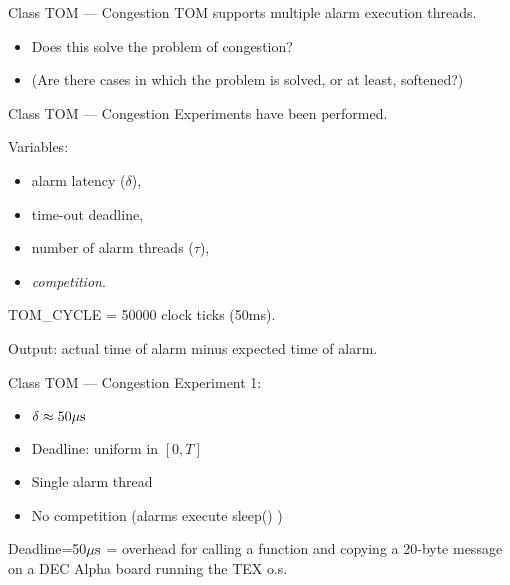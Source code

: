 \begin{frame}[fragile]{Class TOM --- Congestion}
\noindent
TOM supports multiple alarm execution threads.

\vspace{20pt}

\begin{itemize}
  \item Does this solve the problem of congestion?  
  \item (Are there cases in which the problem is solved, or 
  at least, softened?)
\end{itemize}



\end{frame}
\begin{frame}[fragile]{Class TOM --- Congestion}
\noindent
Experiments have been performed.

\noindent
Variables: 
\begin{itemize}
\item alarm latency ($\delta$),
\item time-out deadline,
\item number of alarm threads ($\tau$),
\item \emph{competition}.
\end{itemize}


\vspace{20pt}

\noindent
{\sf TOM\_CYCLE} = 50000 clock ticks (50ms).


\vspace{20pt}

\noindent
Output: actual time of alarm minus expected time of alarm.


\end{frame}
\begin{frame}[fragile]{Class TOM --- Congestion}
\noindent
Experiment 1:
\begin{itemize}
\item $\delta\approx50\mu\hbox{s}$
\item Deadline: uniform in $[0,T]$
\item Single alarm thread
\item No competition (alarms execute \textsf{sleep()} )
\end{itemize}


\vspace{20pt}

\noindent
Deadline=50$\mu\hbox{s}$ = overhead for calling a function and copying a
20-byte message on
a DEC Alpha board running the TEX o.s.



\end{frame}
